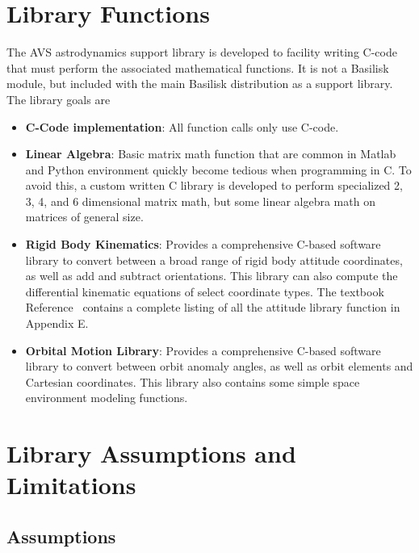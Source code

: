 
\section{Library Functions}

The AVS astrodynamics support library is developed to facility writing C-code that must perform the associated mathematical functions.  It is not a Basilisk module, but included with the main Basilisk distribution as a support library.  The library goals are

\begin{itemize}
	\item \textbf{C-Code implementation}: All function calls only use C-code.
	\item \textbf{Linear Algebra}: Basic matrix math function that are common in Matlab and Python environment quickly become tedious when programming in C.  To avoid this, a custom written C library is developed to perform specialized 2, 3, 4, and 6 dimensional matrix math, but some linear algebra math on matrices of general size.
	\item \textbf{Rigid Body Kinematics}: Provides a comprehensive C-based software library to convert between a broad range of rigid body attitude coordinates, as well as add and subtract orientations.  This library can also compute the differential kinematic equations of select coordinate types. The textbook  Reference~ contains a complete listing of all the attitude library function in Appendix E.
	\item \textbf{Orbital Motion Library}:  Provides a comprehensive C-based software library to convert between orbit anomaly angles, as well as orbit elements and Cartesian coordinates.  This library also contains some simple space environment modeling functions.  
	
\end{itemize}



\section{Library Assumptions and Limitations}

\subsection{Assumptions}
